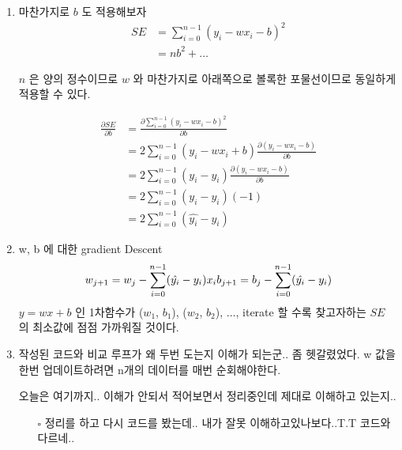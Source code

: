 \documentclass[11pt]{article}
\begin{document}
\begin{enumerate}
\item 마찬가지로 \(b\) 도 적용해보자
\label{sec:org675433b}
\begin{equation*}
\begin{split}
  SE & = \sum_{i=0}^{n-1} ({y_{i} - wx_{i} - b})^2 \\
     & = nb^2 + \dots
\end{split}
\end{equation*}

\(n\) 은 양의 정수이므로 \(w\) 와 마찬가지로 아래쪽으로 볼록한 포물선이므로 동일하게 적용할 수 있다.

\begin{equation}
\begin{split}
  \frac{\partial{SE}}{\partial{b}} & =  \frac{\partial{\sum_{i=0}^{n-1} ({y_{i} - wx_{i} - b})^2}} {\partial{b}} \\
                                   & = 2\sum_{i=0}^{n-1} ({y_{i} - wx_{i} + b}) \frac{\partial{({y_{i} - wx_{i} - b})}}{\partial{b}} \\
                                   & = 2\sum_{i=0}^{n-1} ({y_{i} - \hat{y_{i}}}) \frac{\partial{({y_{i} - wx_{i} - b})}}{\partial{b}} \\
                                   & = 2\sum_{i=0}^{n-1} ({y_{i} - \hat{y_{i}}})(-1) \\
                                   & = 2\sum_{i=0}^{n-1} (\hat{y_{i}} - {y_{i}})
\end{split}
\end{equation}

\item w, b 에 대한 gradient Descent
\label{sec:orgf38a252}
\begin{equation*}
w_{j+1} = w_{j} - \sum_{i=0}^{n-1} (\hat{y_{i}} - {y_{i}})x_{i} \\
b_{j+1} = b_{j} - \sum_{i=0}^{n-1} (\hat{y_{i}} - {y_{i}})
\end{equation*}
\(y = wx + b\) 인 1차함수가 (\(w_{1}\), \(b_{1}\)), (\(w_{2}\), \(b_{2}\)), \(\dots\), iterate 할 수록 찾고자하는 \(SE\) 의 최소값에 점점 가까워질 것이다. 

\item 작성된 코드와 비교
\label{sec:orgbf0293c}
루프가 왜 두번 도는지 이해가 되는군.. 좀 헷갈렸었다. w 값을 한번 업데이트하려면 n개의 데이터를 매번 순회해야한다.

오늘은 여기까지.. 이해가 안되서 적어보면서 정리중인데 제대로 이해하고 있는지..

\begin{itemize}
\item[{$\square$}] 정리를 하고 다시 코드를 봤는데.. 내가 잘못 이해하고있나보다..T.T 코드와 다르네..
\end{itemize}


\end{enumerate}
\end{document}
